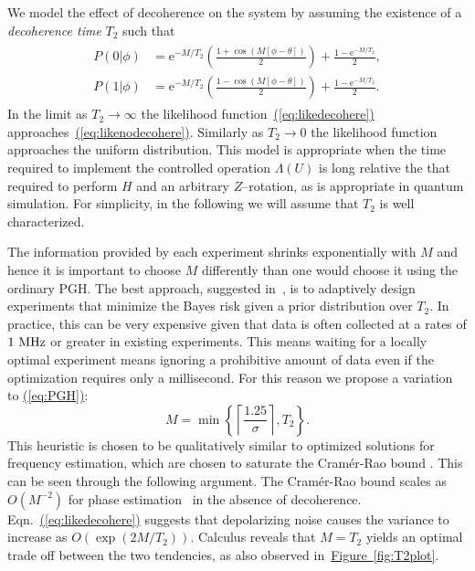 \documentclass[aps,pra,amsmath,twocolumn,amssymb,superscriptaddress]{revtex4-1}
\newcommand{\eq}[1]{\hyperref[eq:#1]{(\ref*{eq:#1})}}
\newcommand{\fig}[1]{\hyperref[fig:#1]{Figure~\ref*{fig:#1}}}
\newcommand{\ee}{\mathrm{e}}
\begin{document}
We model the effect of decoherence on the system by assuming the existence of a \emph{decoherence time} $T_2$ such that
\begin{gather}
    \label{eq:likedecohere}
    \begin{aligned}
        P(0|\phi) & = \ee^{-M/T_2}\left(\frac{1+\cos(M[\phi -\theta])}{2}\right)+\frac{1-\ee^{-M/T_2}}{2},\\
        P(1|\phi) & = \ee^{-M/T_2}\left(\frac{1-\cos(M[\phi -\theta])}{2}\right)+\frac{1-\ee^{-M/T_2}}{2}.
    \end{aligned}
\end{gather}
In the limit as $T_2\rightarrow \infty$ the likelihood function~\eq{likedecohere} approaches~\eq{likenodecohere}.  Similarly as $T_2\rightarrow 0$ the likelihood function approaches the uniform distribution.  This model is appropriate when the time required to implement the controlled operation $\Lambda(U)$ is long relative the that required to perform $H$ and an arbitrary $Z$--rotation, as is appropriate in quantum simulation.  For simplicity, in the following we will assume that $T_2$ is well characterized. 


The information provided by each experiment shrinks exponentially with $M$ and hence it is important to choose $M$ differently than one would choose it using the ordinary PGH.  The best approach, suggested in~\cite{granade_robust_2012}, is to adaptively design experiments that minimize the Bayes risk given a prior distribution over $T_2$.  In practice, this can be very expensive given that data is often collected at a rates of $1~{\rm MHz}$ or greater in existing experiments.  This means waiting for a locally optimal experiment means ignoring a prohibitive amount of data even if the optimization requires only a millisecond.  For this reason we propose a variation to \eq{PGH}:
\begin{equation}
M=\min\left\{\left\lceil\frac{1.25}{\sigma}\right\rceil, T_2 \right\}.
\end{equation}
This heuristic is chosen to be qualitatively similar to optimized solutions for
frequency estimation, which are chosen to saturate the Cram\'er-Rao bound \cite{ferrie_how_2013}.
This can be seen through the following argument.  The Cram\'er-Rao bound scales as $O(M^{-2})$ for phase estimation~\cite{WGC15} in the absence of decoherence.  Eqn.~\eq{likedecohere} suggests that depolarizing noise causes the variance to increase as $O(\exp(2M/T_2))$.  Calculus reveals that $M=T_2$ yields an optimal trade off between the two tendencies, as also observed in~\fig{T2plot}.
\end{document}

